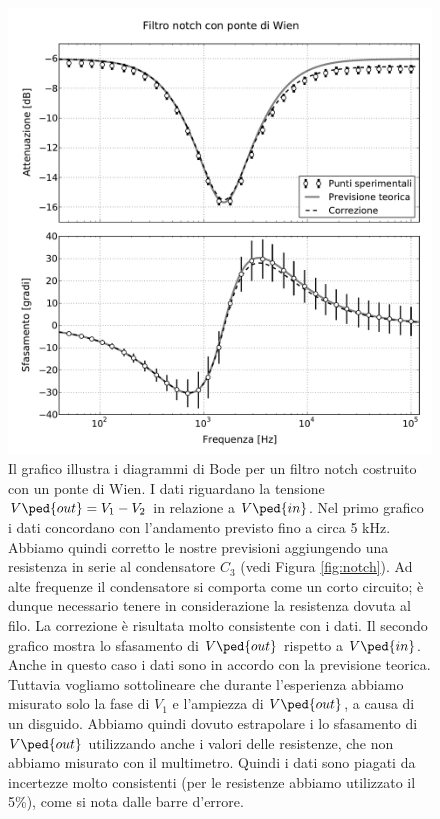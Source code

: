 \begin{figure}
    \includegraphics[scale=0.50]{g.pdf}
    \caption{Il grafico illustra i diagrammi di Bode per un filtro notch costruito con un
        ponte di Wien.
        I dati riguardano la tensione $V\ped{out} = V_1 - V_2$ in relazione a $V\ped{in}$. 
        Nel primo grafico i dati concordano con l'andamento previsto
        fino a circa 5 kHz. Abbiamo quindi corretto le nostre previsioni aggiungendo una resistenza
        in serie al condensatore $C_3$ (vedi Figura \ref{fig:notch}). Ad alte frequenze il
        condensatore si comporta come un corto circuito; è dunque necessario tenere in
        considerazione la resistenza dovuta al filo.
        La correzione è risultata molto consistente con i dati.
        Il secondo grafico mostra lo sfasamento di
        $V\ped{out}$ rispetto a $V\ped{in}$. Anche in questo caso i dati sono in accordo
        con la previsione teorica. Tuttavia vogliamo sottolineare che durante l'esperienza
        abbiamo misurato solo la fase di $V_1$ e l'ampiezza di $V\ped{out}$, a causa di un
        disguido. Abbiamo quindi dovuto estrapolare i lo sfasamento di $V\ped{out}$ utilizzando
        anche i valori delle resistenze, che non abbiamo misurato con il multimetro. Quindi
        i dati sono piagati da incertezze molto consistenti (per le resistenze
        abbiamo utilizzato il 5\%), come si nota dalle barre d'errore. 
    }
    \label{fig:g}
\end{figure}
